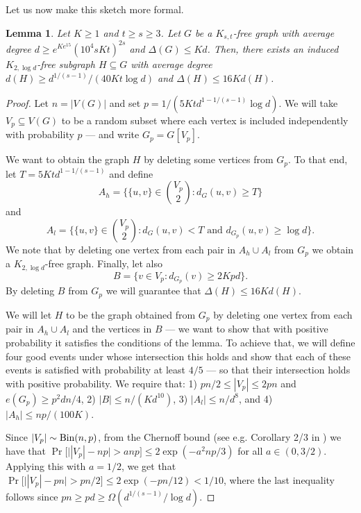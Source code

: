\documentclass[10pt, a4paper]{article}
\numberwithin{theorem}{section} %
\newtheorem{lemma}[theorem]{Lemma}
\theoremstyle{remark}
\theoremstyle{definition}
\begin{document}
Let us now make this sketch more formal.
\begin{lemma}\label{lemma:reduction_to_k2t}
    Let $K \geq 1$ and $t \geq s \geq 3$.
    Let $G$ be a $K_{s,t}$-free graph with average degree $d \geq e^{Ke^{15}} (10^4sKt)^{2s}$ and $\Delta(G) \leq Kd$.
    Then, there exists an induced $K_{2, \log d}$-free subgraph $H \subseteq G$ with average degree $d(H) \geq d^{1/(s-1)}/(40Kt \log d)$ and $\Delta(H) \leq 16Kd(H)$.
\end{lemma}
\begin{proof}
    Let $n = |V(G)|$ and set $p = 1/(5Ktd^{1-1/(s-1)}\log d)$.
    We will take $V_p \subseteq V(G)$ to be a random subset where each vertex is included independently with probability $p$ --- and write $G_p = G[V_p]$.
    
    We want to obtain the graph $H$ by deleting some vertices from $G_p$.
    To that end, let $T = 5Ktd^{1-1/(s-1)}$ and define 
    \[
        A_{h} = \{ \{u, v \} \in \binom{V_p}{2}: d_G(u,v) \geq T\}
    \]
    and
    \[
        A_{l} = \{ \{u,v\} \in \binom{V_p}{2} : d_G(u,v) < T \text{ and } d_{G_p}(u, v) \geq \log d\}.
    \]
    We note that by deleting one vertex from each pair in $A_h \cup A_l$ from $G_p$ we obtain a $K_{2, \log d}$-free graph.
    Finally, let also 
    \[
        B = \{ v \in V_p: d_{G_p}(v) \geq 2Kpd\}.
    \]
    By deleting $B$ from $G_p$ we will guarantee that $\Delta(H) \leq 16Kd(H)$.
    
    We will let $H$ to be the graph obtained from $G_p$ by deleting one vertex from each pair in $A_h \cup A_l$ and the vertices in $B$ --- we want to show that with positive probability it satisfies the conditions of the lemma.
    To achieve that, we will define four good events under whose intersection this holds and show that each of these events is satisfied with probability at least $4/5$ --- so that their intersection holds with positive probability. We require that: 1) $pn/2 \leq |V_p| \leq 2pn$ and $e(G_p) \geq p^2dn/4$, 2) $|B| \leq n/(Kd^{10})$, 3) $|A_l| \leq n/d^8$, and 4) $|A_h| \leq np/(100K)$.

    Since $|V_p|\sim {\rm Bin}(n, p)$, from the Chernoff bound (see e.g. Corollary 2/3 in \cite{JLR}) we have that $\Pr\big[\big||V_p|-np\big|>a np\big]\leq 2\exp(-a^2 np/3)$ for all $a\in (0, 3/2)$. Applying this with $a=1/2$, we get that $\Pr\big[\big||V_p|-pn\big|>pn/2\big]\leq 2\exp(-pn/12)<1/10$, where the last inequality follows since $pn\geq pd\geq \Omega(d^{1/(s-1)}/\log d)$.



\end{proof}
\end{document}
